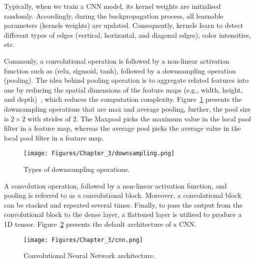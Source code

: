 Typically,  when we train a CNN model, its kernel weights are initialised randomly.
Accordingly, during the backpropagation process, all learnable parameters (kernels weights) are updated.
Consequently, kernels learn to detect different types of edges (vertical, horizontal, and diagonal edges), color intensities, etc.

Commonly, a convolutional operation is followed by a non-linear activation function such as (relu, sigmoid, tanh), followed by a downsampling operation (pooling).
The idea behind pooling operation is to aggregate related features into one by reducing the spatial dimensions of the feature maps (e.g., width, height, and depth)~\cite{Lecun2015}, which reduces the computation complexity.
Figure~\ref{fig:downsampling} presents the downsampling operations that are max and average pooling, further, the pool size is \(2 \times 2\) with strides of \(2\).
The Maxpool picks the maximum value in the local pool filter in a feature map, whereas the average pool picks the average value in the local pool filter in a feature map.
\begin{figure} [!ht]
	\begin{center}
		\centering
		\texttt{[image: Figures/Chapter\_3/downsampling.png]}
	\end{center}
	\caption{Types of downsampling operations.} 
	\label{fig:downsampling}
\end{figure}
A convolution operation, followed by a non-linear activation function, and pooling is referred to as a convolutional block.
Moreover, a convolutional block can be stacked and repeated several times. 
Finally, to pass the output from the convolutional block to the dense layer, a flattened layer is utilised to produce a 1D tensor.
Figure~\ref{fig:CNN} presents the default architecture of a CNN.
\begin{figure} [!ht]
	\begin{center}
		\centering
		\texttt{[image: Figures/Chapter\_3/cnn.png]}
	\end{center}
	\caption{Convolutional Neural Network architecture.} 
	\label{fig:CNN}
\end{figure}

